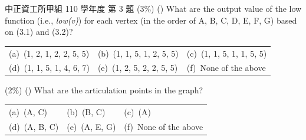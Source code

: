 \begin{pastexam}[label={px:ccu-110-swa-01}]{中正資工所甲組 110 學年度 第 3 題}
 (3\%) (\quad) What are the output value of the low function (i.e., \textit{low(v)}) for
each vertex (in the order of A, B, C, D, E, F, G) based on (3.1) and (3.2)?

\begin{tabular}{@{}lll@{}}
(a)~(1, 2, 1, 2, 2, 5, 5) & (b)~(1, 1, 5, 1, 2, 5, 5) & (c)~(1, 1, 5, 1, 1, 5, 5) \\
(d)~(1, 1, 5, 1, 4, 6, 7) & (e)~(1, 2, 5, 2, 2, 5, 5) & (f)~None of the above
\end{tabular}

 (2\%) (\quad) What are the articulation points in the graph?

\begin{tabular}{@{}lll@{}}
(a)~(A, C) & (b)~(B, C) & (c)~(A) \\
(d)~(A, B, C) & (e)~(A, E, G) & (f)~None of the above
\end{tabular}
\end{pastexam}

